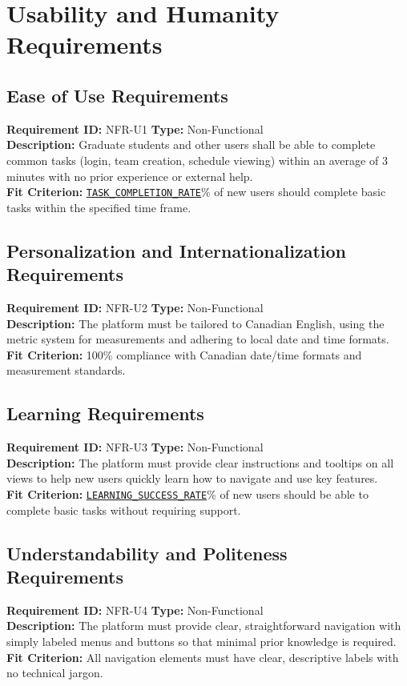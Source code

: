 \documentclass[12pt, titlepage]{article}
\begin{document}
\section{Usability and Humanity Requirements}
\subsection{Ease of Use Requirements}
\textbf{Requirement ID:} NFR-U1 \quad \textbf{Type:} Non-Functional \\
\textbf{Description:} Graduate students and other users shall be able to complete common tasks (login, team creation, schedule viewing) within an average of 3 minutes with no prior experience or external help.\\
\textbf{Fit Criterion:} \hyperref[TASK_COMPLETION_RATE]{\texttt{TASK\_COMPLETION\_RATE}}\% of new users should complete basic tasks within the specified time frame.

\subsection{Personalization and Internationalization Requirements}
\textbf{Requirement ID:} NFR-U2 \quad \textbf{Type:} Non-Functional \\
\textbf{Description:} The platform must be tailored to Canadian English, using the metric system for measurements and adhering to local date and time formats.\\
\textbf{Fit Criterion:} 100\% compliance with Canadian date/time formats and measurement standards.

\subsection{Learning Requirements}
\textbf{Requirement ID:} NFR-U3 \quad \textbf{Type:} Non-Functional \\
\textbf{Description:} The platform must provide clear instructions and tooltips on all views to help new users quickly learn how to navigate and use key features.\\
\textbf{Fit Criterion:} \hyperref[LEARNING_SUCCESS_RATE]{\texttt{LEARNING\_SUCCESS\_RATE}}\% of new users should be able to complete basic tasks without requiring support.

\subsection{Understandability and Politeness Requirements}
\textbf{Requirement ID:} NFR-U4 \quad \textbf{Type:} Non-Functional \\
\textbf{Description:} The platform must provide clear, straightforward navigation with simply labeled menus and buttons so that minimal prior knowledge is required.\\
\textbf{Fit Criterion:} All navigation elements must have clear, descriptive labels with no technical jargon.
\end{document}
